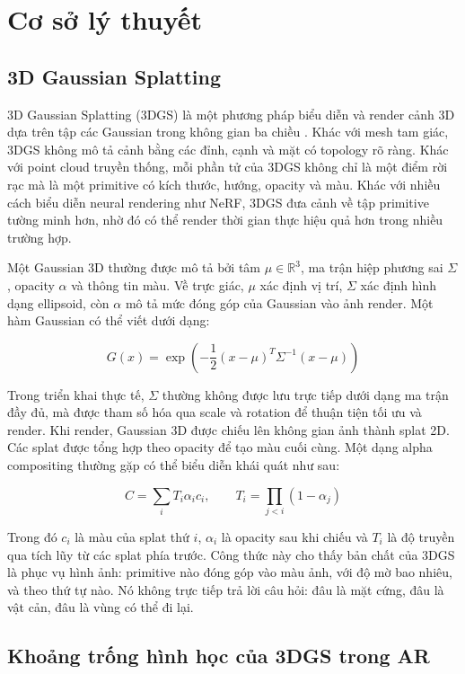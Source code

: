 \section{Cơ sở lý thuyết}

\subsection{3D Gaussian Splatting}

3D Gaussian Splatting (3DGS) là một phương pháp biểu diễn và render cảnh 3D dựa trên tập các Gaussian trong không gian ba chiều \cite{Kerbl2023}. Khác với mesh tam giác, 3DGS không mô tả cảnh bằng các đỉnh, cạnh và mặt có topology rõ ràng. Khác với point cloud truyền thống, mỗi phần tử của 3DGS không chỉ là một điểm rời rạc mà là một primitive có kích thước, hướng, opacity và màu. Khác với nhiều cách biểu diễn neural rendering như NeRF, 3DGS đưa cảnh về tập primitive tường minh hơn, nhờ đó có thể render thời gian thực hiệu quả hơn trong nhiều trường hợp.

Một Gaussian 3D thường được mô tả bởi tâm $\mu \in \mathbb{R}^{3}$, ma trận hiệp phương sai $\Sigma$, opacity $\alpha$ và thông tin màu. Về trực giác, $\mu$ xác định vị trí, $\Sigma$ xác định hình dạng ellipsoid, còn $\alpha$ mô tả mức đóng góp của Gaussian vào ảnh render. Một hàm Gaussian có thể viết dưới dạng:

\[
G(x) = \exp \left(-\frac{1}{2}(x-\mu)^T\Sigma^{-1}(x-\mu)\right)
\]

Trong triển khai thực tế, $\Sigma$ thường không được lưu trực tiếp dưới dạng ma trận đầy đủ, mà được tham số hóa qua scale và rotation để thuận tiện tối ưu và render. Khi render, Gaussian 3D được chiếu lên không gian ảnh thành splat 2D. Các splat được tổng hợp theo opacity để tạo màu cuối cùng. Một dạng alpha compositing thường gặp có thể biểu diễn khái quát như sau:

\[
C = \sum_i T_i \alpha_i c_i,\qquad
T_i = \prod_{j<i}(1-\alpha_j)
\]

Trong đó $c_i$ là màu của splat thứ $i$, $\alpha_i$ là opacity sau khi chiếu và $T_i$ là độ truyền qua tích lũy từ các splat phía trước. Công thức này cho thấy bản chất của 3DGS là phục vụ hình ảnh: primitive nào đóng góp vào màu ảnh, với độ mờ bao nhiêu, và theo thứ tự nào. Nó không trực tiếp trả lời câu hỏi: đâu là mặt cứng, đâu là vật cản, đâu là vùng có thể đi lại.

\subsection{Khoảng trống hình học của 3DGS trong AR}

